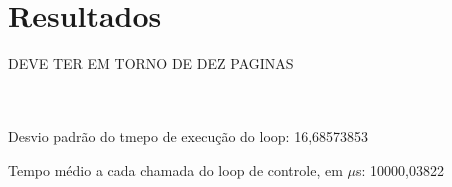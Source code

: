 \section{Resultados}
\label{sec:resultados}

DEVE TER EM TORNO DE DEZ PAGINAS


\\\\
Desvio padrão do tmepo de execução do loop: 16,68573853

Tempo médio a cada chamada do loop de controle, em $\mu$s: 10000,03822
